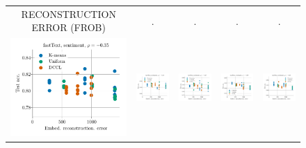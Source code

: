 \begin{figure}
\begin{tabular}{@{\hskip -0.0in}c@{\hskip -0.0in}c@{\hskip -0.0in}c@{\hskip -0.0in}c@{\hskip -0.0in}c@{\hskip -0.0in}}
		RECONSTRUCTION ERROR (FROB) & . & . & . & .\\
		\includegraphics[width=.2\linewidth]{figures/fasttext1m_sentiment_mr_test-acc_vs_embed-frob-error_linx.pdf} &
		\includegraphics[width=.2\linewidth]{figures/fasttext1m_sentiment_subj_test-acc_vs_embed-frob-error_linx.pdf} &
		\includegraphics[width=.2\linewidth]{figures/fasttext1m_sentiment_cr_test-acc_vs_embed-frob-error_linx.pdf} &
		\includegraphics[width=.2\linewidth]{figures/fasttext1m_sentiment_sst_test-acc_vs_embed-frob-error_linx.pdf} &
		\includegraphics[width=.2\linewidth]{figures/fasttext1m_sentiment_mpqa_test-acc_vs_embed-frob-error_linx.pdf} \\
		

\end{tabular}
\end{figure}
